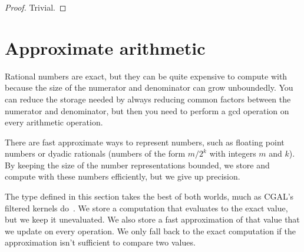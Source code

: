 \begin{proof}
  \leanok
  Trivial.
\end{proof}


\section{Approximate arithmetic}
Rational numbers are exact, but they can be quite expensive to compute with
because the size of the numerator and denominator can grow unboundedly. You can
reduce the storage needed by always reducing common factors between the
numerator and denominator, but then you need to perform a gcd operation on every
arithmetic operation.

There are fast approximate ways to represent numbers, such as floating point
numbers or dyadic rationals (numbers of the form $m/2^k$ with integers $m$ and
$k$). By keeping the size of the number representations bounded, we store and
compute with these numbers efficiently, but we give up precision.

The  type defined in this section takes the best of both
worlds, much as CGAL's filtered kernels do~\cite{cgal}. We store a computation
that evaluates to the exact value, but we keep it unevaluated. We also store a fast approximation of that value that we update on
every operation. We only fall back to the exact computation if the approximation
isn't sufficient to compare two values.


